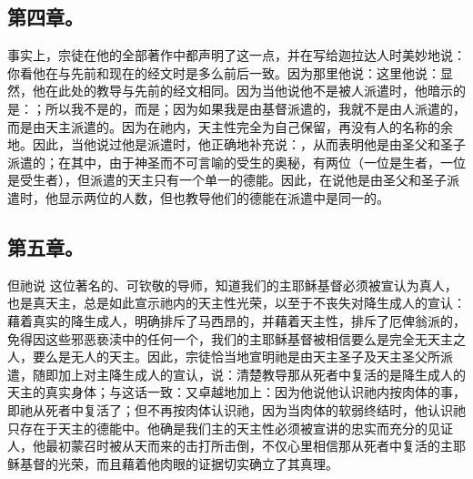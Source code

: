 
\subsection{第四章。}

\par

事实上，宗徒在他的全部著作中都声明了这一点，并在写给迦拉达人时美妙地说： 你看他在与先前和现在的经文时是多么前后一致。因为那里他说：这里他说：显然，他在此处的教导与先前的经文相同。因为当他说他不是被人派遣时，他暗示的是：；所以我不是的，而是；因为如果我是由基督派遣的，我就不是由人派遣的，而是由天主派遣的。因为在祂内，天主性完全为自己保留，再没有人的名称的余地。因此，当他说过他是派遣时，他正确地补充说：，从而表明他是由圣父和圣子派遣的；在其中，由于神圣而不可言喻的受生的奥秘，有两位（一位是生者，一位是受生者），但派遣的天主只有一个单一的德能。因此，在说他是由圣父和圣子派遣时，他显示两位的人数，但也教导他们的德能在派遣中是同一的。\par


\subsection{第五章。}

\par

但祂说  这位著名的、可钦敬的导师，知道我们的主耶稣基督必须被宣认为真人，也是真天主，总是如此宣示祂内的天主性光荣，以至于不丧失对降生成人的宣认：藉着真实的降生成人，明确排斥了马西昂的，并藉着天主性，排斥了厄俾翁派的，免得因这些邪恶亵渎中的任何一个，我们的主耶稣基督被相信要么是完全无天主之人，要么是无人的天主。因此，宗徒恰当地宣明祂是由天主圣子及天主圣父所派遣，随即加上对主降生成人的宣认，说：清楚教导那从死者中复活的是降生成人的天主的真实身体；与这话一致：又卓越地加上：因为他说他认识祂内按肉体的事，即祂从死者中复活了；但不再按肉体认识祂，因为当肉体的软弱终结时，他认识祂只存在于天主的德能中。他确是我们主的天主性必须被宣讲的忠实而充分的见证人，他最初蒙召时被从天而来的击打所击倒，不仅心里相信那从死者中复活的主耶稣基督的光荣，而且藉着他肉眼的证据切实确立了其真理。\par

